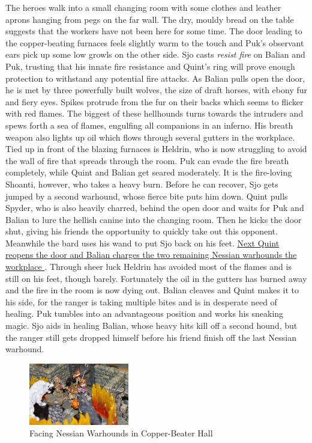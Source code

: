 The heroes walk into a small changing room with some clothes and leather aprons hanging from pegs on the far wall. The dry, mouldy bread on the table suggests that the workers have not been here for some time. The door leading to the copper-beating furnaces feels slightly warm to the touch and Puk's observant ears pick up some low growls on the other side. Sjo casts {\itshape resist fire} on Balian and Puk, trusting that his innate fire resistance and Quint's ring will prove enough protection to withstand any potential fire attacks. As Balian pulls open the door, he is met by three powerfully built wolves, the size of draft horses, with ebony fur and fiery eyes. Spikes protrude from the fur on their backs which seems to flicker with red flames. The biggest of these hellhounds turns towards the intruders and spews forth a sea of flames, engulfing all companions in an inferno. His breath weapon also lights up oil which flows through several gutters in the workplace. Tied up in front of the blazing furnaces is Heldrin, who is now struggling to avoid the wall of fire that spreads through the room. Puk can evade the fire breath completely, while Quint and Balian get seared moderately. It is the fire-loving Shoanti, however, who takes a heavy burn. Before he can recover, Sjo gets jumped by a second warhound, whose fierce bite puts him down. Quint pulls Spyder, who is also heavily charred, behind the open door and waits for Puk and Balian to lure the hellish canine into the changing room. Then he kicks the door shut, giving his friends the opportunity to quickly take out this opponent. Meanwhile the bard uses his wand to put Sjo back on his feet. \hyperref[fig:Facing-Nessian-Warhounds-in-Copper-Beater-Hall-555420948]{ Next Quint reopens the door and Balian charges the two remaining Nessian warhounds the workplace } . Through sheer luck Heldrin has avoided most of the flames and is still on his feet, though barely. Fortunately the oil in the gutters has burned away and the fire in the room is now dying out. Balian cleaves and Quint makes it to his side, for the ranger is taking multiple bites and is in desperate need of healing. Puk tumbles into an advantageous position and works his sneaking magic. Sjo aids in healing Balian, whose heavy hits kill off a second hound, but the ranger still gets dropped himself before his friend finish off the last Nessian warhound. \\

\begin{figure}[h]
	\centering
	\includegraphics[width=0.39\textwidth]{images/Facing-Nessian-Warhounds-in-Copper-Beater-Hall-555420948.jpg}
	\caption{Facing Nessian Warhounds in Copper-Beater Hall}
	\label{fig:Facing-Nessian-Warhounds-in-Copper-Beater-Hall-555420948}
\end{figure}

